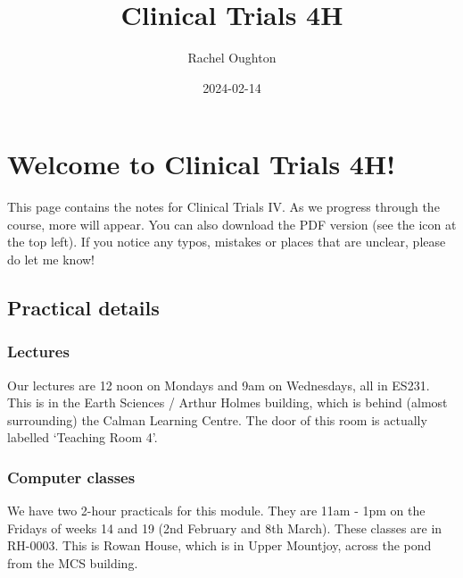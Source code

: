 \documentclass[
  openany]{book}
\title{Clinical Trials 4H}
\author{Rachel Oughton}
\date{2024-02-14}
\theoremstyle{definition}
\theoremstyle{definition}
\theoremstyle{definition}
\theoremstyle{definition}
\theoremstyle{remark}
\begin{document}
\maketitle

{
\setcounter{tocdepth}{1}
\tableofcontents
}
\hypertarget{welcome-to-clinical-trials-4h}{%
\chapter*{Welcome to Clinical Trials 4H!}\label{welcome-to-clinical-trials-4h}}

This page contains the notes for Clinical Trials IV. As we progress through the course, more will appear. You can also download the PDF version (see the icon at the top left). If you notice any typos, mistakes or places that are unclear, please do let me know!

\hypertarget{practical-details}{%
\section*{Practical details}\label{practical-details}}

\hypertarget{lectures}{%
\subsection*{Lectures}\label{lectures}}

Our lectures are 12 noon on Mondays and 9am on Wednesdays, all in ES231. This is in the Earth Sciences / Arthur Holmes building, which is behind (almost surrounding) the Calman Learning Centre. The door of this room is actually labelled `Teaching Room 4'.

\hypertarget{computer-classes}{%
\subsection*{Computer classes}\label{computer-classes}}

We have two 2-hour practicals for this module. They are 11am - 1pm on the Fridays of weeks 14 and 19 (2nd February and 8th March). These classes are in RH-0003. This is Rowan House, which is in Upper Mountjoy, across the pond from the MCS building.
\end{document}
